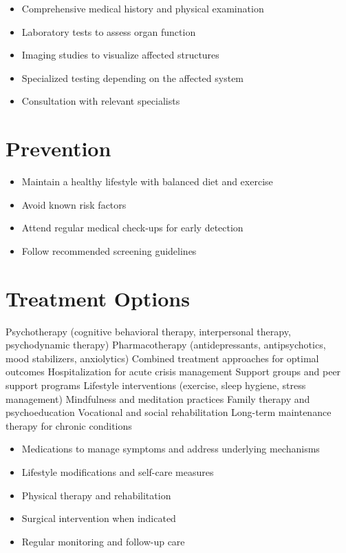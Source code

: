 \begin{itemize}[noitemsep]
  \item Comprehensive medical history and physical examination
  \item Laboratory tests to assess organ function
  \item Imaging studies to visualize affected structures
  \item Specialized testing depending on the affected system
  \item Consultation with relevant specialists
\end{itemize}
\section{Prevention}
\begin{itemize}[noitemsep]
  \item Maintain a healthy lifestyle with balanced diet and exercise
  \item Avoid known risk factors
  \item Attend regular medical check-ups for early detection
  \item Follow recommended screening guidelines
\end{itemize}
\section{Treatment Options}
Psychotherapy (cognitive behavioral therapy, interpersonal therapy, psychodynamic therapy) Pharmacotherapy (antidepressants, antipsychotics, mood stabilizers, anxiolytics) Combined treatment approaches for optimal outcomes Hospitalization for acute crisis management Support groups and peer support programs Lifestyle interventions (exercise, sleep hygiene, stress management) Mindfulness and meditation practices Family therapy and psychoeducation Vocational and social rehabilitation Long-term maintenance therapy for chronic conditions

\begin{itemize}[noitemsep]
  \item Medications to manage symptoms and address underlying mechanisms
  \item Lifestyle modifications and self-care measures
  \item Physical therapy and rehabilitation
  \item Surgical intervention when indicated
  \item Regular monitoring and follow-up care
\end{itemize}
